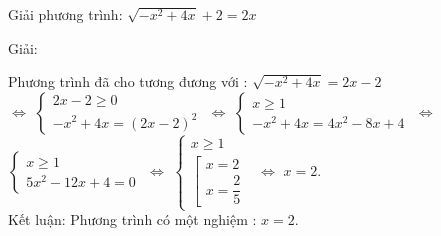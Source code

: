 
      
          \begin{vd}
            Giải phương trình: $ \sqrt{-x^2 + 4x } + 2 = 2x$

          \end{vd}
          \begin{center}

            Giải:
         \end{center}
         
         Phương trình đã cho tương đương với : $ \sqrt{-x^2 +4x} = 2x -2 $ \\
         $ \Leftrightarrow $
         $
         \begin{cases}
          2x -2 \geq 0 \\ 
          -x^2 +4x = (2x-2)^2
         
         \end{cases}
         $
         $ \Leftrightarrow $
         $
         \begin{cases}
          x  \geq 1 \\ 
          -x^2 +4x = 4x^2 -8x + 4         
         \end{cases}
         $
         $ \Leftrightarrow $
         $
         \begin{cases}
          x  \geq 1 \\ 
          5x^2 -12x + 4 =0     
         \end{cases}
         $
         $ \Leftrightarrow $
         $
         \begin{cases}
          x  \geq 1 \\ 
          \left[ 
            \begin{array}{l}
                x=2 \\
                x=\dfrac{2}{5}
            
            \end{array}
          \right.
         \end{cases}
         $
         $ \Leftrightarrow $
         $ x=2 $. \\
         Kết luận: Phương trình có một nghiệm : $ x=2 $. 
         
